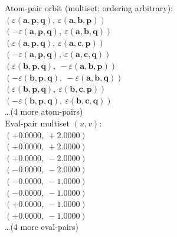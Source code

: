 \documentclass[a4paper,11pt]{article}
\newcommand{\kblbmcpggoncpf}[3]{\varepsilon(\mathbf{#1},\mathbf{#2},\mathbf{#3})}
\begin{document}
\quad Atom-pair orbit (multiset; ordering arbitrary):\\
$(\kblbmcpggoncpf{a}{p}{q},\ \kblbmcpggoncpf{a}{b}{p})$\\
$(-\kblbmcpggoncpf{a}{p}{q},\ \kblbmcpggoncpf{a}{b}{q})$\\
$(\kblbmcpggoncpf{a}{p}{q},\ \kblbmcpggoncpf{a}{c}{p})$\\
$(-\kblbmcpggoncpf{a}{p}{q},\ \kblbmcpggoncpf{a}{c}{q})$\\
$(\kblbmcpggoncpf{b}{p}{q},\ -\kblbmcpggoncpf{a}{b}{p})$\\
$(-\kblbmcpggoncpf{b}{p}{q},\ -\kblbmcpggoncpf{a}{b}{q})$\\
$(\kblbmcpggoncpf{b}{p}{q},\ \kblbmcpggoncpf{b}{c}{p})$\\
$(-\kblbmcpggoncpf{b}{p}{q},\ \kblbmcpggoncpf{b}{c}{q})$\\
\quad \ldots (4 more atom-pairs)\\
\quad Eval-pair multiset $(u, v)$:\\
$(+0.0000,\ +2.0000)$\\
$(+0.0000,\ +2.0000)$\\
$(+0.0000,\ -2.0000)$\\
$(-0.0000,\ -2.0000)$\\
$(-0.0000,\ -1.0000)$\\
$(-0.0000,\ -1.0000)$\\
$(+0.0000,\ -1.0000)$\\
$(+0.0000,\ -1.0000)$\\
\quad \ldots (4 more eval-pairs)\\
\end{document}
